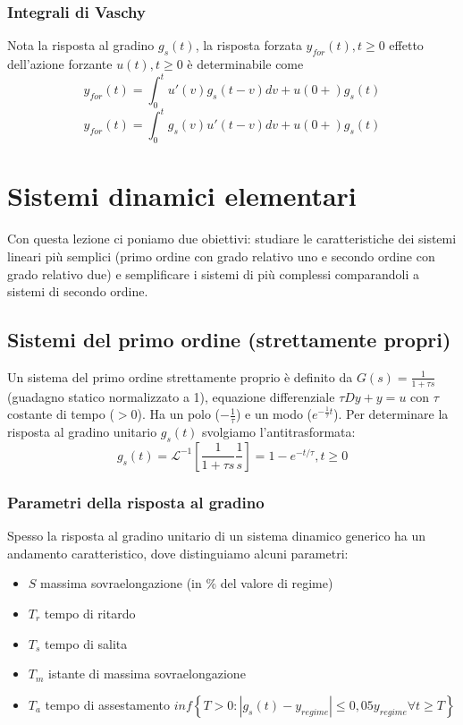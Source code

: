 \documentclass[11pt]{article}
\begin{document}
\subsubsection{Integrali di Vaschy}
Nota la risposta al gradino $g_s(t)$, la risposta forzata $y_{for} (t), t\ge0$ effetto dell'azione forzante $u(t), t\ge0$ è determinabile come
\begin{displaymath}
    y_{for}(t) = \int_0^t u' (v) g_s(t-v) dv + u(0+)g_s(t)
\end{displaymath}
\begin{displaymath}
    y_{for}(t) = \int_0^t  g_s(v) u'(t-v) dv + u(0+)g_s(t)
\end{displaymath}
\section{Sistemi dinamici elementari}
Con questa lezione ci poniamo due obiettivi: studiare le caratteristiche dei sistemi lineari più semplici (primo ordine con grado relativo uno e secondo ordine con grado relativo due) e semplificare i sistemi di più complessi comparandoli a sistemi di secondo ordine.
\subsection{Sistemi del primo ordine (strettamente propri)}
Un sistema del primo ordine strettamente proprio è definito da $G(s)=\frac{1}{1+\tau s}$ (guadagno statico normalizzato a 1), equazione differenziale $\tau Dy + y = u$ con $\tau$ costante di tempo ($>0$). Ha un polo ($-\frac{1}{\tau}$) e un modo ($e^{-\frac{1}{\tau}t}$). Per determinare la risposta al gradino unitario $g_s(t)$ svolgiamo l'antitrasformata:
\begin{displaymath}
    g_s(t) = \mathcal{L}^{-1}\left[\frac{1}{1+\tau s}\frac{1}{s}\right] = 1 - e^{-t/\tau}, t\ge0
\end{displaymath}
\subsubsection{Parametri della risposta al gradino}
Spesso la risposta al gradino unitario di un sistema dinamico generico ha un andamento caratteristico, dove distinguiamo alcuni parametri:
\begin{itemize}
    \item $S$ massima sovraelongazione (in \% del valore di regime)
    \item $T_r$ tempo di ritardo
    \item $T_s$ tempo di salita
    \item $T_m$ istante di massima sovraelongazione
    \item $T_a$ tempo di assestamento $inf\left\{T>0: |g_s(t)-y_{regime}|\le 0,05 y_{regime} \forall t \ge T\right\}$
\end{itemize}
\end{document}

